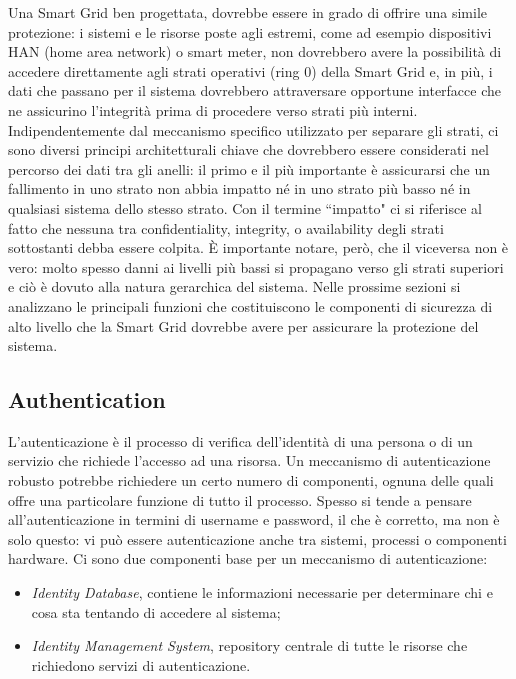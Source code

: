 Una Smart Grid ben progettata, dovrebbe essere in grado di offrire una simile protezione: i sistemi e le risorse poste agli estremi, come ad esempio dispositivi HAN (home area network) o smart meter, non dovrebbero avere la possibilità di accedere direttamente agli strati operativi (ring 0) della Smart Grid e, in più, i dati che passano per il sistema dovrebbero attraversare opportune interfacce che ne assicurino l'integrità prima di procedere verso strati più interni. \newline
Indipendentemente dal meccanismo specifico utilizzato per separare gli strati, ci sono diversi principi architetturali chiave che dovrebbero essere considerati nel percorso dei dati tra gli anelli: il primo e il più importante è assicurarsi che un fallimento in uno strato non abbia impatto né in uno strato più basso né in qualsiasi sistema dello stesso strato. Con il termine ``impatto" ci si riferisce al fatto che nessuna tra confidentiality, integrity, o availability degli strati sottostanti debba essere colpita. È importante notare, però, che il viceversa non è vero: molto spesso danni ai livelli più bassi si propagano verso gli strati superiori e ciò è dovuto alla natura gerarchica del sistema.
\newline \newline 
Nelle prossime sezioni si analizzano le principali funzioni che costituiscono le componenti di sicurezza di alto livello che la Smart Grid dovrebbe avere per assicurare la protezione del sistema.

\subsection{Authentication}
L'autenticazione è il processo di verifica dell'identità di una persona o di un servizio che richiede l'accesso ad una risorsa. \newline Un meccanismo di autenticazione robusto potrebbe richiedere un certo numero di componenti, ognuna delle quali offre una particolare funzione di tutto il processo. \newline Spesso si tende a pensare all'autenticazione in termini di username e password, il che è corretto, ma non è solo questo: vi può essere autenticazione anche tra sistemi, processi o componenti hardware. Ci sono due componenti base per un meccanismo di autenticazione:
\begin{itemize}
\item \textit{Identity Database}, contiene le informazioni necessarie per determinare chi e cosa sta tentando di accedere al sistema;
\item \textit{Identity Management System}, repository centrale di tutte le risorse che richiedono servizi di autenticazione.
\end{itemize}

